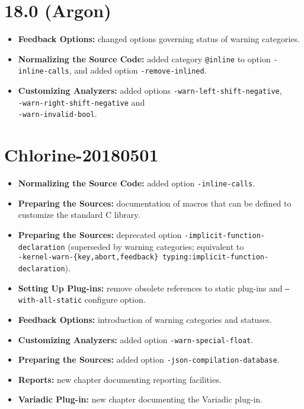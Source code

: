 \section*{18.0 (Argon)}

\begin{itemize}
\item \textbf{Feedback Options:} changed options governing status of warning categories.
\item \textbf{Normalizing the Source Code:} added category \texttt{@inline} to
option \texttt{-inline-calls}, and added option \texttt{-remove-inlined}.
\item \textbf{Customizing Analyzers:} added options
  \texttt{-warn-left-shift-negative}, \\
  \texttt{-warn-right-shift-negative} and \\
  \texttt{-warn-invalid-bool}.
\end{itemize}

\section*{Chlorine-20180501}

\begin{itemize}
\item \textbf{Normalizing the Source Code:} added option \texttt{-inline-calls}.
\item \textbf{Preparing the Sources:} documentation of macros that can be
  defined to customize the standard C library.
\item \textbf{Preparing the Sources:} deprecated option
  \texttt{-implicit-function-declaration} (superseded by
  warning categories; equivalent to\\
  \texttt{-kernel-warn-\{key,abort,feedback\} typing:implicit-function-declaration}).
\item \textbf{Setting Up Plug-ins:} remove obsolete references
 to static plug-ins and \texttt{--with-all-static} configure option.
\item \textbf{Feedback Options:} introduction of warning categories and statuses.
\item \textbf{Customizing Analyzers:} added option \texttt{-warn-special-float}.
\item \textbf{Preparing the Sources:} added option
  \texttt{-json-compilation-database}.
\item \textbf{Reports:} new chapter documenting reporting facilities.
\item \textbf{Variadic Plug-in:} new chapter documenting the Variadic plug-in.
\end{itemize}

